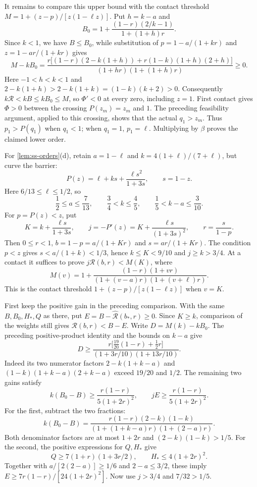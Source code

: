 It remains to compare this upper bound with the contact threshold
$M=1+(z-p)/[z(1-\ell z)]$.
Put $h=k-a$ and
\[
 B_0=1+\frac{(1-r)(2/k-1)}{1+(1+h)r}.
\]
Since $k<1$, we have $B\le B_0$, while substitution of
$p=1-a/(1+kr)$ and $z=1-ar/(1+kr)$ gives
\[
 M-kB_0=
 \frac{r\bigl[(1-r)(2-k(1+h))+r(1-k)(1+h)(2+h)\bigr]}
 {(1+hr)(1+(1+h)r)}\ge0.
\]
Here $-1<h<k<1$ and $2-k(1+h)>2-k(1+k)=(1-k)(k+2)>0$.
Consequently $k\mathcal R<kB\le kB_0\le M$, so $\Phi'<0$ at every zero, including $z=1$.
First contact gives $\Phi>0$ between the crossing $P(z_m)=z_m$ and $1$.
The preceding feasibility argument, applied to this crossing,
shows that the actual $q_1>z_m$.
Thus $p_1>P(q_1)$ when $q_1<1$; when $q_1=1$, $p_1=\ell$.
Multiplying by $\beta$ proves the claimed lower order.

 For \cref{lem:ss-orders}(d), retain $a=1-\ell$ and
$k=4(1+\ell)/(7+\ell)$, but curve the barrier:
\[
 P(z)=\ell+ks+\frac{\ell s^2}{1+3s},\qquad s=1-z.
\]
Here $6/13\le\ell\le1/2$, so
\[
 \frac12\le a\le\frac7{13},\qquad
 \frac34<k\le\frac45,\qquad \frac15<k-a\le\frac3{10}.
\]
For $p=P(z)<z$, put
\[
 K=k+\frac{\ell s}{1+3s},\qquad
 j=-P'(z)=K+\frac{\ell s}{(1+3s)^2},\qquad
 r=\frac{s}{1-p}.
\]
Then $0\le r<1$, $b=1-p=a/(1+Kr)$ and $s=ar/(1+Kr)$.
The condition $p<z$ gives $s<a/(1+k)<1/3$, hence $k\le K<9/10$ and $j\ge k>3/4$.
At a contact it suffices to prove $j\mathcal R(b,r)<M(K)$, where
\[
 M(v)=1+\frac{(1-r)(1+vr)}{(1+(v-a)r)(1+(v+\ell)r)}.
\]
This is the contact threshold $1+(z-p)/[z(1-\ell z)]$ when $v=K$.

First keep the positive gain in the preceding comparison. With the same $B,B_0,H_*,Q$ as
there, put $E=B-\widehat{\mathcal R}(b_*,r)\ge0$.
Since $K\ge k$, comparison of the weights still gives
$\mathcal R(b,r)<B-E$.
Write $D=M(k)-kB_0$. The preceding positive-product identity and the bounds on $k-a$ give
\[
 D\ge\frac{r\bigl[\frac{19}{20}(1-r)+\frac12r\bigr]}
 {(1+3r/10)(1+13r/10)}.
\]
Indeed its two numerator factors $2-k(1+k-a)$ and
$(1-k)(1+k-a)(2+k-a)$ exceed $19/20$ and $1/2$.
The remaining two gains satisfy
\begin{equation}\label{eq:ss-quadratic-gains}
 k(B_0-B)\ge\frac{r(1-r)}{5(1+2r)^2},\qquad
 jE\ge\frac{r(1-r)}{5(1+2r)^2}.
\end{equation}
For the first, subtract the two fractions:
\[
 k(B_0-B)=\frac{r(1-r)(2-k)(1-k)}
 {(1+(1+k-a)r)(1+(2-a)r)}.
\]
Both denominator factors are at most $1+2r$ and $(2-k)(1-k)>1/5$.
For the second, the positive expressions for $Q,H_*$ give
\[
 Q\ge7(1+r)(1+3r/2),\qquad H_*\le4(1+2r)^2.
\]
Together with $a/[2(2-a)]\ge1/6$ and $2-a\le3/2$, these imply
$E\ge7r(1-r)/[24(1+2r)^2]$. Now use $j>3/4$ and $7/32>1/5$.


